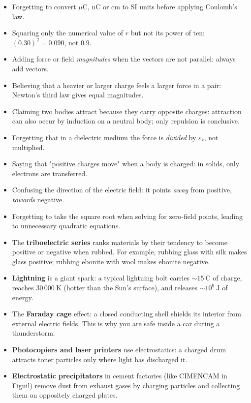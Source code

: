 \documentclass[11pt]{article}
\begin{document}
\begin{attention}
\begin{itemize}
\item Forgetting to convert $\mu\mathrm{C}$, $\mathrm{nC}$ or $\mathrm{cm}$ to SI units before applying Coulomb's law.
\item Squaring only the numerical value of $r$ but not its power of ten: $(0.30)^2 = 0.090$, not $0.9$.
\item Adding force or field \emph{magnitudes} when the vectors are not parallel: always add vectors.
\item Believing that a heavier or larger charge feels a larger force in a pair: Newton's third law gives equal magnitudes.
\item Claiming two bodies attract because they carry opposite charges: attraction can also occur by induction on a neutral body; only repulsion is conclusive.
\item Forgetting that in a dielectric medium the force is \emph{divided} by $\varepsilon_r$, not multiplied.
\item Saying that "positive charges move" when a body is charged: in solids, only electrons are transferred.
\item Confusing the direction of the electric field: it points \emph{away} from positive, \emph{towards} negative.
\item Forgetting to take the square root when solving for zero-field points, leading to unnecessary quadratic equations.
\end{itemize}
\end{attention}

\begin{savaistu}
\begin{itemize}
\item The \textbf{triboelectric series} ranks materials by their tendency to become positive or negative when rubbed. For example, rubbing glass with silk makes glass positive; rubbing ebonite with wool makes ebonite negative.
\item \textbf{Lightning} is a giant spark: a typical lightning bolt carries $\sim 15\ \mathrm{C}$ of charge, reaches $30\,000\ \mathrm{K}$ (hotter than the Sun's surface), and releases $\sim 10^9\ \mathrm{J}$ of energy.
\item The \textbf{Faraday cage} effect: a closed conducting shell shields its interior from external electric fields. This is why you are safe inside a car during a thunderstorm.
\item \textbf{Photocopiers and laser printers} use electrostatics: a charged drum attracts toner particles only where light has discharged it.
\item \textbf{Electrostatic precipitators} in cement factories (like CIMENCAM in Figuil) remove dust from exhaust gases by charging particles and collecting them on oppositely charged plates.
\end{itemize}
\end{savaistu}
\end{document}
